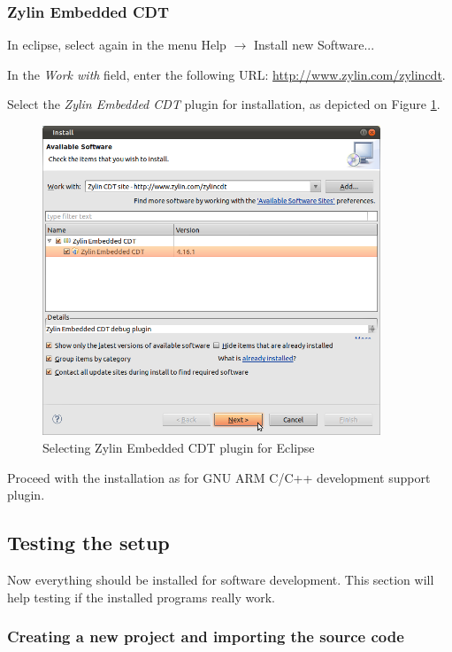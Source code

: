 \documentclass[a4paper, 10pt]{article}
\begin{document}
\subsubsection{Zylin Embedded CDT}

In eclipse, select again in the menu Help $\rightarrow$ Install new Software...

In the \emph{Work with} field, enter the following URL:
\url{http://www.zylin.com/zylincdt}.

Select the \emph{Zylin Embedded CDT} plugin for installation,
as depicted on Figure \ref{fig:eclipse-zylin}.

    \begin{figure}[H]
    \centering
        \includegraphics[width=0.9\textwidth]{./install-guide-linux-images/eclipse-zylin.png}
        \caption{Selecting Zylin Embedded CDT plugin for Eclipse}
        \label{fig:eclipse-zylin}
    \end{figure}

Proceed with the installation as for GNU ARM C/C++ development support plugin.


\subsection{Testing the setup}

Now everything should be installed for software development.
This section will help testing if the installed programs really work.

\subsubsection{Creating a new project and importing the source code}
\end{document}
